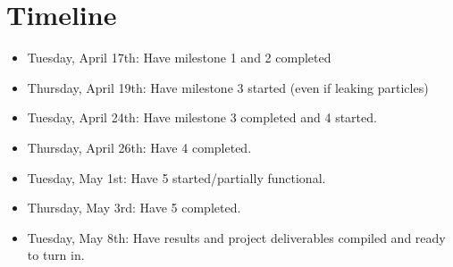 \documentclass{article}
\begin{document}
\section{Timeline}
\begin{itemize}
  \item Tuesday, April 17th: Have milestone 1 and 2 completed
  \item Thursday, April 19th: Have milestone 3 started (even if leaking particles)
  \item Tuesday, April 24th: Have milestone 3 completed and 4 started. 
  \item Thursday, April 26th: Have 4 completed.
  \item Tuesday, May 1st: Have 5 started/partially functional.
  \item Thursday, May 3rd: Have 5 completed.
  \item Tuesday, May 8th: Have results and project deliverables compiled and ready to turn in.
\end{itemize}
\end{document}
